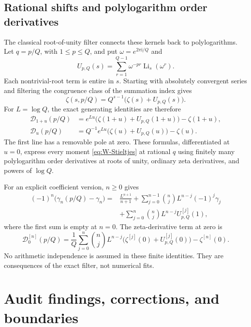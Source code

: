 \documentclass[11pt]{article}
\numberwithin{equation}{section}
\theoremstyle{definition}
\DeclareMathOperator{\Li}{Li}
\newcommand{\ii}{\mathrm i}
\newcommand{\DD}{\mathcal D}
\begin{document}
\subsection{Rational shifts and polylogarithm order derivatives}
The classical root-of-unity filter connects these kernels back to polylogarithms. Let $q=p/Q$, with $1\le p\le Q$, and put $\omega=e^{2\pi\ii/Q}$ and
\[
 U_{p,Q}(s)=\sum_{r=1}^{Q-1}\omega^{-pr}\Li_s(\omega^r).
\]
Each nontrivial-root term is entire in $s$. Starting with absolutely convergent series and filtering the congruence class of the summation index gives
\begin{equation}\label{eq:root-filter}
 \zeta(s,p/Q)=Q^{s-1}\bigl(\zeta(s)+U_{p,Q}(s)\bigr).
\end{equation}
For $L=\log Q$, the exact generating identities are therefore
\begin{align}
 \DD_{1+u}(p/Q)
 &=e^{Lu}\bigl(\zeta(1+u)+U_{p,Q}(1+u)\bigr)-\zeta(1+u),
 \label{eq:rational-one}\\
 \DD_u(p/Q)
 &=Q^{-1}e^{Lu}\bigl(\zeta(u)+U_{p,Q}(u)\bigr)-\zeta(u).
 \label{eq:rational-zero}
\end{align}
The first line has a removable pole at zero. These formulas, differentiated at $u=0$, express every moment \eqref{eq:W-Stieltjes} at rational $q$ using finitely many polylogarithm order derivatives at roots of unity, ordinary zeta derivatives, and powers of $\log Q$.

For an explicit coefficient version, $n\ge0$ gives
\begin{equation}\label{eq:gamma-rational}
 \begin{split}
 (-1)^n\bigl(\gamma_n(p/Q)-\gamma_n\bigr)
 ={}&\frac{L^{n+1}}{n+1}
 +\sum_{j=0}^{n-1}\binom njL^{n-j}(-1)^j\gamma_j\\
 &+\sum_{j=0}^n\binom njL^{n-j}U_{p,Q}^{[j]}(1),
 \end{split}
\end{equation}
where the first sum is empty at $n=0$. The zeta-derivative term at zero is
\begin{equation}\label{eq:zeta-rational-zero}
 \DD_0^{[n]}(p/Q)=\frac1Q\sum_{j=0}^n\binom njL^{n-j}
 \bigl(\zeta^{[j]}(0)+U_{p,Q}^{[j]}(0)\bigr)-\zeta^{[n]}(0).
\end{equation}
No arithmetic independence is assumed in these finite identities. They are consequences of the exact filter, not numerical fits.

\section{Audit findings, corrections, and boundaries}\label{sec:audit}
\end{document}
